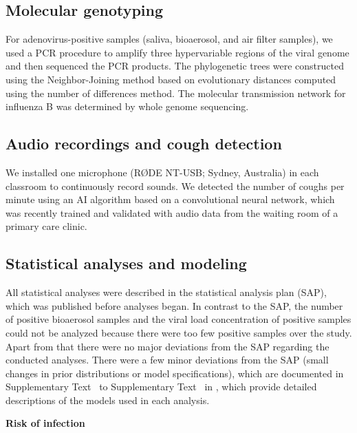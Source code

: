 \documentclass[fleqn,11pt]{wlscirep}
\begin{document}
\subsection{Molecular genotyping}

For adenovirus-positive samples (saliva, bioaerosol, and air filter samples), we used a PCR procedure to amplify three hypervariable regions of the viral genome and then sequenced the PCR products\cite{Akello2020ClinicEpi}. The phylogenetic trees were constructed using the Neighbor-Joining method based on evolutionary distances computed using the number of differences method. The molecular transmission network for influenza B was determined by whole genome sequencing\cite{Kelly2022FrontiersImmuno}.

\subsection{Audio recordings and cough detection}

We installed one microphone (RØDE NT-USB; Sydney, Australia) in each classroom to continuously record sounds. We detected the number of coughs per minute using an AI algorithm based on a convolutional neural network\cite{Bertschinger2023IEEE}, which was recently trained and validated with audio data from the waiting room of a primary care clinic\cite{Zurcher2022}. 

\subsection{Statistical analyses and modeling}

All statistical analyses were described in the statistical analysis plan (SAP)\cite{Banholzer2023SAP}, which was published before analyses began. In contrast to the SAP, the number of positive bioaerosol samples and the viral load concentration of positive samples could not be analyzed because there were too few positive samples over the study. Apart from that there were no major deviations from the SAP regarding the conducted analyses. There were a few minor deviations from the SAP (\eg small changes in prior distributions or model specifications), which are documented in Supplementary Text~ to Supplementary Text~ in \supp, which provide detailed descriptions of the models used in each analysis.

\noindent\textbf{Risk of infection} \smallskip
\end{document}
